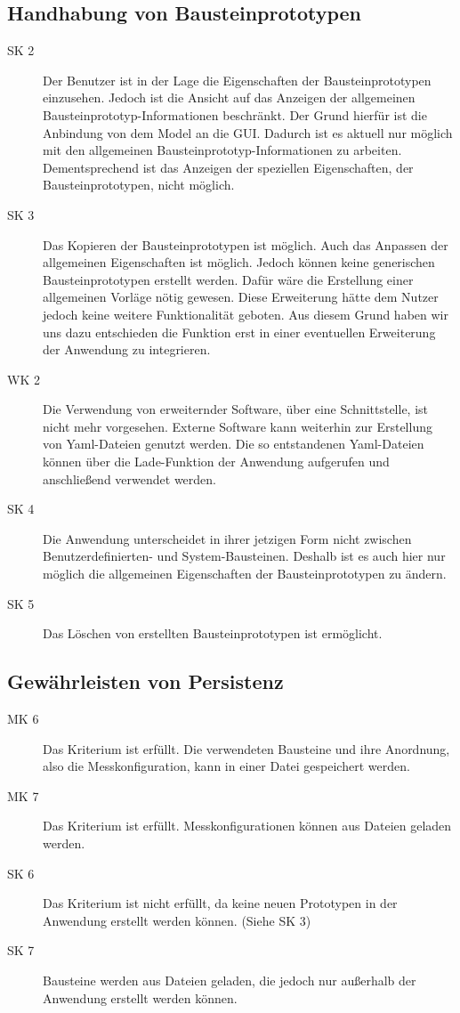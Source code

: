 \documentclass[parskip=full]{scrartcl}
\begin{document}
\subsection{Handhabung von Bausteinprototypen}

\begin{description}
	\item[SK 2] Der Benutzer ist in der Lage die Eigenschaften der Bausteinprototypen einzusehen. Jedoch ist die Ansicht auf das Anzeigen der \gls{allgemeinen Bausteinprototyp-Informationen} beschränkt. Der Grund hierfür ist die Anbindung von dem Model an die GUI. Dadurch ist es aktuell nur möglich mit den allgemeinen Bausteinprototyp-Informationen zu arbeiten. Dementsprechend ist das Anzeigen der speziellen Eigenschaften, der Bausteinprototypen, nicht möglich.
	\item[SK 3] Das Kopieren der Bausteinprototypen ist möglich. Auch das Anpassen der allgemeinen Eigenschaften ist möglich. Jedoch können keine generischen Bausteinprototypen erstellt werden. Dafür wäre die Erstellung einer allgemeinen Vorläge nötig gewesen. Diese Erweiterung hätte dem Nutzer jedoch keine weitere Funktionalität geboten. Aus diesem Grund haben wir uns dazu entschieden die Funktion erst in einer eventuellen Erweiterung der Anwendung zu integrieren.
	\item[WK 2] Die Verwendung von erweiternder Software, über eine Schnittstelle, ist nicht mehr vorgesehen. Externe Software kann weiterhin zur Erstellung von Yaml-Dateien genutzt werden. Die so entstandenen Yaml-Dateien können über die Lade-Funktion der Anwendung aufgerufen und anschließend verwendet werden.
	\item[SK 4] Die Anwendung unterscheidet in ihrer jetzigen Form nicht zwischen Benutzerdefinierten- und System-Bausteinen. Deshalb ist es auch hier nur möglich die allgemeinen Eigenschaften der Bausteinprototypen zu ändern.
	\item[SK 5] Das Löschen von erstellten Bausteinprototypen ist ermöglicht.
\end{description}
		
\subsection{Gewährleisten von Persistenz}

\begin{description}
\item[MK 6] Das Kriterium ist erfüllt. Die verwendeten Bausteine und ihre Anordnung, also die Messkonfiguration, kann in einer Datei gespeichert werden.
\item[MK 7] Das Kriterium ist erfüllt. Messkonfigurationen können aus Dateien geladen werden.
\item[SK 6] Das Kriterium ist nicht erfüllt, da keine neuen Prototypen in der Anwendung erstellt werden können. (Siehe SK 3)
\item[SK 7] Bausteine werden aus Dateien geladen, die jedoch nur außerhalb der Anwendung erstellt werden können.
\end{description}
\end{document}
